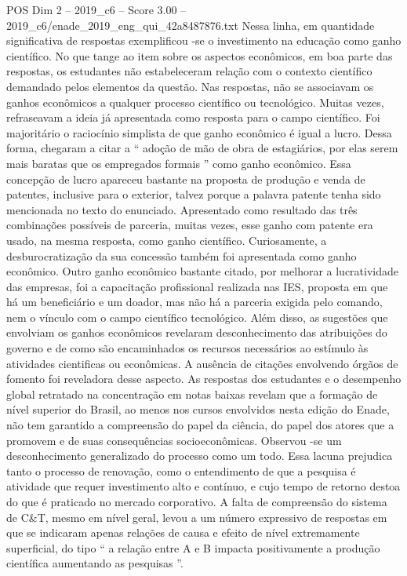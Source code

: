 \begin{textsample}{POS Dim 2 – 2019\_c6 – Score 3.00 – 2019\_c6/enade\_2019\_eng\_qui\_42a8487876.txt}
Nessa linha, em quantidade significativa de respostas exemplificou -se o investimento na educação como ganho científico.
No que tange ao item sobre os aspectos econômicos, em boa parte das respostas, os estudantes não estabeleceram relação com o contexto científico demandado pelos elementos da questão.
Nas respostas, não se associavam os ganhos econômicos a qualquer processo científico ou tecnológico.
Muitas vezes, refraseavam a ideia já apresentada como resposta para o campo científico.
Foi majoritário o raciocínio simplista de que ganho econômico é igual a lucro.
Dessa forma, chegaram a citar a “ adoção de mão de obra de estagiários, por elas serem mais baratas que os empregados formais ” como ganho econômico.
Essa concepção de lucro apareceu bastante na proposta de produção e venda de patentes, inclusive para o exterior, talvez porque a palavra patente tenha sido mencionada no texto do enunciado.
Apresentado como resultado das três combinações possíveis de parceria, muitas vezes, esse ganho com patente era usado, na mesma resposta, como ganho científico.
Curiosamente, a desburocratização da sua concessão também foi apresentada como ganho econômico.
Outro ganho econômico bastante citado, por melhorar a lucratividade das empresas, foi a capacitação profissional realizada nas IES, proposta em que há um beneficiário e um doador, mas não há a parceria exigida pelo comando, nem o vínculo com o campo científico tecnológico.
Além disso, as sugestões que envolviam os ganhos econômicos revelaram desconhecimento das atribuições do governo e de como são encaminhados os recursos necessários ao estímulo às atividades cientificas ou econômicas.
A ausência de citações envolvendo órgãos de fomento foi reveladora desse aspecto.
As respostas dos estudantes e o desempenho global retratado na concentração em notas baixas revelam que a formação de nível superior do Brasil, ao menos nos cursos envolvidos nesta edição do Enade, não tem garantido a compreensão do papel da ciência, do papel dos atores que a promovem e de suas consequências socioeconômicas.
Observou -se um desconhecimento generalizado do processo como um todo.
Essa lacuna prejudica tanto o processo de renovação, como o entendimento de que a pesquisa é atividade que requer investimento alto e contínuo, e cujo tempo de retorno destoa do que é praticado no mercado corporativo.
A falta de compreensão do sistema de C\&T, mesmo em nível geral, levou a um número expressivo de respostas em que se indicaram apenas relações de causa e efeito de nível extremamente superficial, do tipo “ a relação entre A e B impacta positivamente a produção científica aumentando as pesquisas ”.

\end{textsample}
